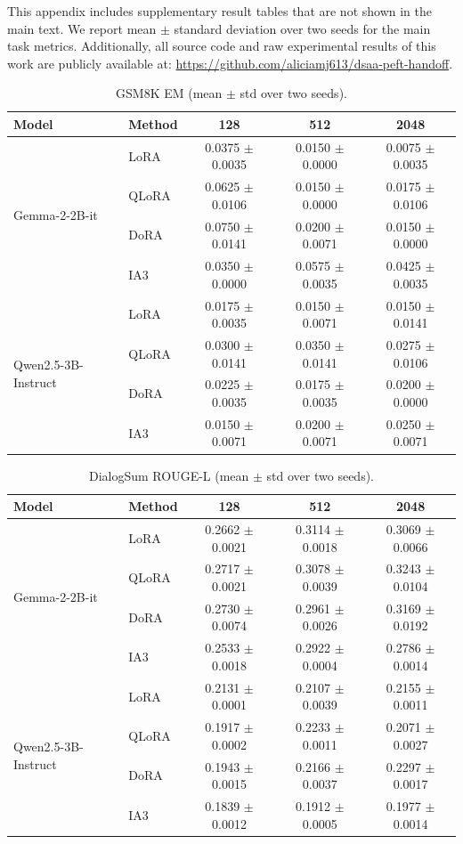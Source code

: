 \documentclass{article}
\begin{document}
This appendix includes supplementary result tables that are not shown in the main text. We report mean $\pm$ standard deviation over two seeds for the main task metrics. Additionally, all source code and raw experimental results of this work are publicly available at: \href{https://github.com/aliciamj613/dsaa-peft-handoff}{https://github.com/aliciamj613/dsaa-peft-handoff}.


\begin{table}[H]
\centering
\small
\caption{GSM8K EM (mean $\pm$ std over two seeds).}
\begin{tabular}{llccc}
\toprule
Model & Method & 128 & 512 & 2048 \\
\midrule
\multirow{4}{*}{Gemma-2-2B-it} & LoRA & 0.0375 $\pm$ 0.0035 & 0.0150 $\pm$ 0.0000 & 0.0075 $\pm$ 0.0035 \\
 & QLoRA & 0.0625 $\pm$ 0.0106 & 0.0150 $\pm$ 0.0000 & 0.0175 $\pm$ 0.0106 \\
 & DoRA & 0.0750 $\pm$ 0.0141 & 0.0200 $\pm$ 0.0071 & 0.0150 $\pm$ 0.0000 \\
 & IA3 & 0.0350 $\pm$ 0.0000 & 0.0575 $\pm$ 0.0035 & 0.0425 $\pm$ 0.0035 \\
\midrule
\multirow{4}{*}{Qwen2.5-3B-Instruct} & LoRA & 0.0175 $\pm$ 0.0035 & 0.0150 $\pm$ 0.0071 & 0.0150 $\pm$ 0.0141 \\
 & QLoRA & 0.0300 $\pm$ 0.0141 & 0.0350 $\pm$ 0.0141 & 0.0275 $\pm$ 0.0106 \\
 & DoRA & 0.0225 $\pm$ 0.0035 & 0.0175 $\pm$ 0.0035 & 0.0200 $\pm$ 0.0000 \\
 & IA3 & 0.0150 $\pm$ 0.0071 & 0.0200 $\pm$ 0.0071 & 0.0250 $\pm$ 0.0071 \\
\bottomrule
\end{tabular}
\end{table}

\begin{table}[H]
\centering
\small
\caption{DialogSum ROUGE-L (mean $\pm$ std over two seeds).}
\begin{tabular}{llccc}
\toprule
Model & Method & 128 & 512 & 2048 \\
\midrule
\multirow{4}{*}{Gemma-2-2B-it} & LoRA & 0.2662 $\pm$ 0.0021 & 0.3114 $\pm$ 0.0018 & 0.3069 $\pm$ 0.0066 \\
 & QLoRA & 0.2717 $\pm$ 0.0021 & 0.3078 $\pm$ 0.0039 & 0.3243 $\pm$ 0.0104 \\
 & DoRA & 0.2730 $\pm$ 0.0074 & 0.2961 $\pm$ 0.0026 & 0.3169 $\pm$ 0.0192 \\
 & IA3 & 0.2533 $\pm$ 0.0018 & 0.2922 $\pm$ 0.0004 & 0.2786 $\pm$ 0.0014 \\
\midrule
\multirow{4}{*}{Qwen2.5-3B-Instruct} & LoRA & 0.2131 $\pm$ 0.0001 & 0.2107 $\pm$ 0.0039 & 0.2155 $\pm$ 0.0011 \\
 & QLoRA & 0.1917 $\pm$ 0.0002 & 0.2233 $\pm$ 0.0011 & 0.2071 $\pm$ 0.0027 \\
 & DoRA & 0.1943 $\pm$ 0.0015 & 0.2166 $\pm$ 0.0037 & 0.2297 $\pm$ 0.0017 \\
 & IA3 & 0.1839 $\pm$ 0.0012 & 0.1912 $\pm$ 0.0005 & 0.1977 $\pm$ 0.0014 \\
\bottomrule
\end{tabular}
\end{table}
\end{document}
